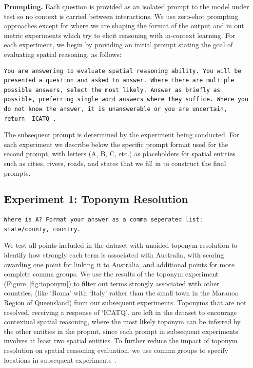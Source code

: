 \textbf{Prompting.} 
Each question is provided as an isolated prompt to the model under test so no context is carried between interactions.
We use zero-shot prompting approaches except for where we are shaping the format of the output and in out metric experiments which try to elicit reasoning with in-context learning. 
For each experiment, we begin by providing an initial prompt stating the goal of evaluating spatial reasoning, as follows:

\begin{lstlisting}[title=Prompt 1: Initial System Prompt]
    You are answering to evaluate spatial reasoning ability. You will be presented a question and asked to answer. Where there are multiple possible answers, select the most likely. Answer as briefly as possible, preferring single word answers where they suffice. Where you do not know the answer, it is unanswerable or you are uncertain, return 'ICATQ'.
\end{lstlisting}

\noindent The subsequent prompt is determined by the experiment being conducted.
For each experiment we describe below the specific prompt format used for the second prompt, with letters (A, B, C, etc.) as placeholders for spatial entities such as cities, rivers, roads, and states that we fill in to construct the final prompts.


\subsection{Experiment 1: Toponym Resolution}

\begin{lstlisting}[title=Prompt 2: Toponym Resolution Prompt]
    Where is A? Format your answer as a comma seperated list: state/county, country.
\end{lstlisting}

\noindent We test all points included in the dataset with unaided toponym resolution to identify how strongly each term is associated with Australia, with scoring awarding one point for linking it to Australia, and additional points for more complete comma groups.
We use the results of the toponym experiment (Figure~\ref{fig:toponym}) to filter out terms strongly associated with other countries, (like `Roma' with `Italy' rather than the small town in the Maranoa Region of Queensland) from our subsequent experiments. 
Toponyms that are not resolved, receiving a response of `ICATQ', are left in the dataset to encourage contextual spatial reasoning, where the most likely toponym can be inferred by the other entities in the propmt, since each prompt in subsequent experiments involves at least two spatial entities.
To further reduce the impact of toponym resolution on spatial reasoning evaluation, we use comma groups to specify locations in subsequent experiments~\cite{Lieberman2010}.


